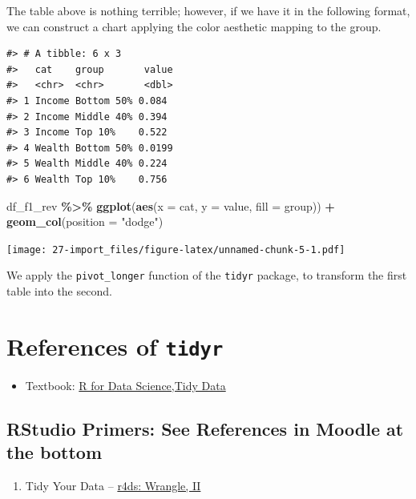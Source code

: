 \documentclass[
  xelatex, ja=standard]{bxjsbook}
\newenvironment{Shaded}{\begin{snugshade}}{\end{snugshade}}
\newcommand{\AttributeTok}[1]{\textcolor[rgb]{0.13,0.29,0.53}{#1}}
\newcommand{\FunctionTok}[1]{\textcolor[rgb]{0.13,0.29,0.53}{\textbf{#1}}}
\newcommand{\NormalTok}[1]{#1}
\newcommand{\SpecialCharTok}[1]{\textcolor[rgb]{0.81,0.36,0.00}{\textbf{#1}}}
\newcommand{\StringTok}[1]{\textcolor[rgb]{0.31,0.60,0.02}{#1}}
\providecommand{\tightlist}{%
  \setlength{\itemsep}{0pt}\setlength{\parskip}{0pt}}
\theoremstyle{definition}
\theoremstyle{definition}
\theoremstyle{definition}
\theoremstyle{definition}
\theoremstyle{remark}
\begin{document}
The table above is nothing terrible; however, if we have it in the following format, we can construct a chart applying the color aesthetic mapping to the group.

\begin{verbatim}
#> # A tibble: 6 x 3
#>   cat    group       value
#>   <chr>  <chr>       <dbl>
#> 1 Income Bottom 50% 0.084 
#> 2 Income Middle 40% 0.394 
#> 3 Income Top 10%    0.522 
#> 4 Wealth Bottom 50% 0.0199
#> 5 Wealth Middle 40% 0.224 
#> 6 Wealth Top 10%    0.756
\end{verbatim}

\begin{Shaded}
\begin{Highlighting}[]
\NormalTok{df\_f1\_rev }\SpecialCharTok{\%\textgreater{}\%}
  \FunctionTok{ggplot}\NormalTok{(}\FunctionTok{aes}\NormalTok{(}\AttributeTok{x =}\NormalTok{ cat, }\AttributeTok{y =}\NormalTok{ value, }\AttributeTok{fill =}\NormalTok{ group)) }\SpecialCharTok{+}
  \FunctionTok{geom\_col}\NormalTok{(}\AttributeTok{position =} \StringTok{"dodge"}\NormalTok{)}
\end{Highlighting}
\end{Shaded}

\texttt{[image: 27-import\_files/figure-latex/unnamed-chunk-5-1.pdf]}

We apply the \texttt{pivot\_longer} function of the \texttt{tidyr} package, to transform the first table into the second.

\hypertarget{references-of-tidyr}{%
\section{\texorpdfstring{References of \texttt{tidyr}}{References of tidyr}}\label{references-of-tidyr}}

\begin{itemize}
\tightlist
\item
  Textbook: \href{https://r4ds.had.co.nz/tidy-data.html\#tidy-data}{R for Data Science,Tidy Data}
\end{itemize}

\hypertarget{rstudio-primers-see-references-in-moodle-at-the-bottom}{%
\subsection{RStudio Primers: See References in Moodle at the bottom}\label{rstudio-primers-see-references-in-moodle-at-the-bottom}}

\begin{enumerate}
\def\labelenumi{\arabic{enumi}.}
\setcounter{enumi}{3}
\tightlist
\item
  Tidy Your Data -- \href{https://r4ds.had.co.nz/wrangle-intro.html\#wrangle-intro}{r4ds: Wrangle, II}
\end{enumerate}
\end{document}
